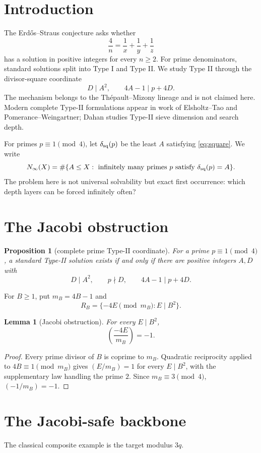 \documentclass[11pt]{article}
\newtheorem{lemma}[theorem]{Lemma}
\newtheorem{proposition}[theorem]{Proposition}
\theoremstyle{definition}
\newcommand{\sqdepth}{\delta_{\rm sq}}
\begin{document}
\section{Introduction}
The Erd\H{o}s--Straus conjecture asks whether
\[
\frac4n=\frac1x+\frac1y+\frac1z
\]
has a solution in positive integers for every $n\ge2$. For prime denominators, standard solutions split into Type I and Type II. We study Type II through the divisor-square coordinate
\begin{equation}\label{eq:square}
D\mid A^2,\qquad 4A-1\mid p+4D.
\end{equation}
The mechanism belongs to the Th\'epault--Mizony lineage and is not claimed here. Modern complete Type-II formulations appear in work of Elsholtz--Tao and Pomerance--Weingartner; Dahan studies Type-II sieve dimension and search depth.

For primes $p\equiv1\pmod4$, let $\sqdepth(p)$ be the least $A$ satisfying \eqref{eq:square}. We write
\[
N_\infty(X)=\#\{A\le X:\text{ infinitely many primes }p\text{ satisfy }\sqdepth(p)=A\}.
\]
The problem here is not universal solvability but exact first occurrence: which depth layers can be forced infinitely often?

\section{The Jacobi obstruction}
\begin{proposition}[complete prime Type-II coordinate]\label{prop:complete}
For a prime $p\equiv1\pmod4$, a standard Type-II solution exists if and only if there are positive integers $A,D$ with
\[
D\mid A^2,\qquad p\nmid D,\qquad 4A-1\mid p+4D.
\]
\end{proposition}

For $B\ge1$, put $m_B=4B-1$ and
\[
R_B=\{-4E\pmod{m_B}:E\mid B^2\}.
\]

\begin{lemma}[Jacobi obstruction]\label{lem:jacobi}
For every $E\mid B^2$,
\[
\boxed{\left(\frac{-4E}{m_B}\right)=-1.}
\]
\end{lemma}

\begin{proof}
Every prime divisor of $B$ is coprime to $m_B$. Quadratic reciprocity applied to $4B\equiv1\pmod{m_B}$ gives $(E/m_B)=1$ for every $E\mid B^2$, with the supplementary law handling the prime $2$. Since $m_B\equiv3\pmod4$, $(-1/m_B)=-1$.
\end{proof}

\section{The Jacobi-safe backbone}
The classical composite example is the target modulus $3q$.
\end{document}
